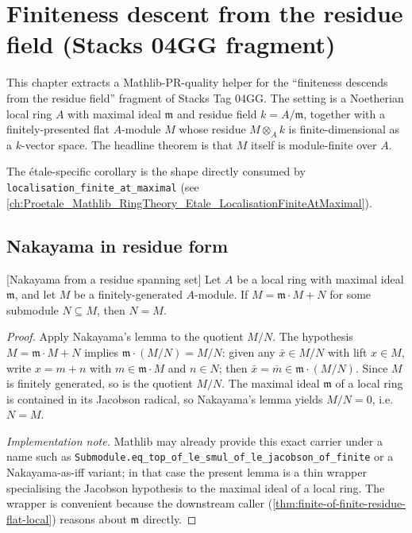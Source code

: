 \chapter{Finiteness descent from the residue field (Stacks 04GG fragment)}
\label{ch:Proetale_Mathlib_RingTheory_Module_FiniteResidue}

This chapter extracts a Mathlib-PR-quality helper for the
``finiteness descends from the residue field'' fragment of
Stacks Tag 04GG. The setting is a Noetherian local ring \(A\) with
maximal ideal \(\mathfrak{m}\) and residue field \(k = A/\mathfrak{m}\),
together with a finitely-presented flat \(A\)-module \(M\) whose
residue \(M \otimes_A k\) is finite-dimensional as a \(k\)-vector
space. The headline theorem is that \(M\) itself is module-finite
over \(A\).

The étale-specific corollary is the shape directly consumed by
\texttt{localisation\_finite\_at\_maximal} (see
\cref{ch:Proetale_Mathlib_RingTheory_Etale_LocalisationFiniteAtMaximal}).


\section{Nakayama in residue form}

\begin{lemma}
  \label{lem:nakayama-residue-spanning}
  [Nakayama from a residue spanning set]
  Let \(A\) be a local ring with maximal ideal \(\mathfrak{m}\), and
  let \(M\) be a finitely-generated \(A\)-module. If
  \(M = \mathfrak{m} \cdot M + N\) for some submodule
  \(N \subseteq M\), then \(N = M\).
\end{lemma}

\begin{proof}
  Apply Nakayama's lemma to the quotient \(M/N\). The hypothesis
  \(M = \mathfrak{m} \cdot M + N\) implies
  \(\mathfrak{m} \cdot (M/N) = M/N\): given any \(\bar x \in M/N\)
  with lift \(x \in M\), write \(x = m + n\) with \(m \in
  \mathfrak{m} \cdot M\) and \(n \in N\); then
  \(\bar x = \overline{m} \in \mathfrak{m} \cdot (M/N)\). Since
  \(M\) is finitely generated, so is the quotient \(M/N\). The
  maximal ideal \(\mathfrak{m}\) of a local ring is contained in
  its Jacobson radical, so Nakayama's lemma yields \(M/N = 0\),
  i.e.\ \(N = M\).

  \emph{Implementation note.} Mathlib may already provide this
  exact carrier under a name such as
  \texttt{Submodule.eq\_top\_of\_le\_smul\_of\_le\_jacobson\_of\_finite}
  or a Nakayama-as-iff variant; in that case the present lemma is a
  thin wrapper specialising the Jacobson hypothesis to the maximal
  ideal of a local ring. The wrapper is convenient because the
  downstream caller (\cref{thm:finite-of-finite-residue-flat-local})
  reasons about \(\mathfrak{m}\) directly.
\end{proof}

